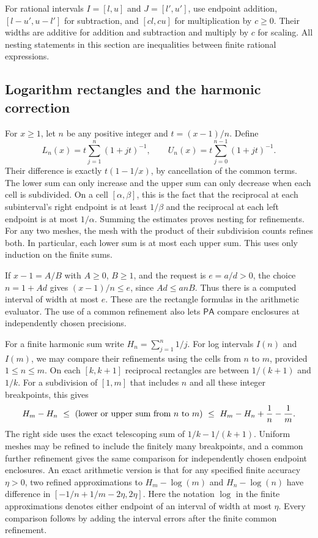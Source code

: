 \documentclass[11pt]{amsart}
\theoremstyle{definition}
\theoremstyle{remark}
\numberwithin{equation}{section}
\newcommand{\PA}{\mathsf{PA}}
\begin{document}
For rational intervals $I=[l,u]$ and $J=[l',u']$, use endpoint addition,
$[l-u',u-l']$ for subtraction, and $[cl,cu]$ for multiplication by
$c\ge0$. Their widths are additive for addition and subtraction and
multiply by $c$ for scaling. All nesting statements in this section
are inequalities between finite rational expressions.

\subsection{Logarithm rectangles and the harmonic correction}
\label{sec:log-rectangles}

For $x\ge1$, let $n$ be any positive integer and $t=(x-1)/n$.
Define
\[
 L_n(x)=t\sum_{j=1}^n (1+jt)^{-1},\qquad
 U_n(x)=t\sum_{j=0}^{n-1}(1+jt)^{-1}.
\]
Their difference is exactly $t(1-1/x)$, by cancellation of the
common terms. The lower sum can only increase and the upper sum
can only decrease when each cell is subdivided. On a cell
$[\alpha,\beta]$, this is the fact that the reciprocal at each
subinterval's right endpoint is at least $1/\beta$ and the
reciprocal at each left endpoint is at most $1/\alpha$.
Summing the estimates proves nesting for refinements.
For any two meshes, the mesh with the product of their subdivision
counts refines both. In particular, each lower sum is at most each
upper sum. This uses only induction on the finite sums.

If $x-1=A/B$ with $A\ge0$, $B\ge1$, and the request is $e=a/d>0$,
the choice $n=1+Ad$ gives $(x-1)/n\le e$, since
$Ad\le anB$. Thus there is a computed interval of width at most $e$.
These are the rectangle formulas in the arithmetic evaluator.
The use of a common refinement also lets $\PA$ compare enclosures
at independently chosen precisions.

For a finite harmonic sum write $H_n=\sum_{j=1}^n 1/j$.
For log intervals $I(n)$ and $I(m)$, we may compare their refinements
using the cells from $n$ to $m$, provided $1\le n\le m$. On each
$[k,k+1]$ reciprocal rectangles are between $1/(k+1)$ and $1/k$.
For a subdivision of $[1,m]$ that includes $n$ and all these integer
breakpoints, this gives
\[
 H_m-H_n\ \le\ (\hbox{lower or upper sum from }n\hbox{ to }m)
        \ \le\ H_m-H_n+\frac1n-\frac1m .
\]
The right side uses the exact telescoping sum of $1/k-1/(k+1)$.
Uniform meshes may be refined to include the finitely many
breakpoints, and a common further refinement gives the same
comparison for independently chosen endpoint enclosures. An exact
arithmetic version is that for any specified finite accuracy
$\eta>0$, two refined approximations to $H_m-\log(m)$ and
$H_n-\log(n)$ have difference in
$[-1/n+1/m-2\eta,2\eta]$.
Here the notation $\log$ in the finite approximations denotes
either endpoint of an interval of width at most $\eta$.
Every comparison follows by adding the interval errors after the
finite common refinement.
\end{document}
